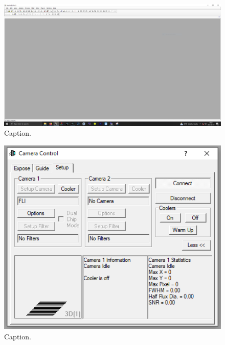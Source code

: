 \documentclass{article}
\begin{document}
	\begin{figure}[htbp!]
		\centering
		\includegraphics[scale=0.25]{images/maxim-1.png}
		\caption{Caption.}
		\label{fig:maxim-1}
	\end{figure}
	
	\begin{figure}[htbp!]
		\centering
		\includegraphics[scale=0.75]{images/maxim-2.png}
		\caption{Caption.}
		\label{fig:maxim-2}
	\end{figure}
	
\end{document}
